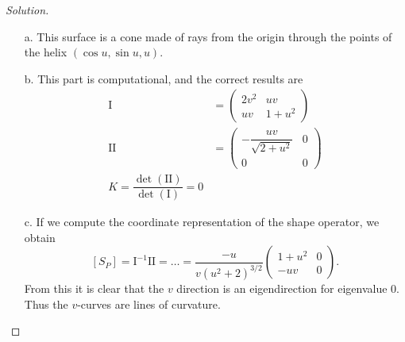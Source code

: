 \documentclass[Shifrin_Solutions_Spring_2015]{subfiles}
\begin{document}
\begin{proof}[Solution]
\begin{itemize}
\item[a.] This surface is a cone made of rays from the origin through the points of the helix $(\cos u, \sin u, u)$.

\item[b.] This part is computational, and the correct results are
\begin{align*}
\mathrm{I} & = \begin{pmatrix} 2v^2 & uv \\ uv & 1+u^2 \end{pmatrix} \\
\mathrm{II} & = \begin{pmatrix} -\dfrac{uv}{\sqrt{2+u^2}} & 0 \\ 0 & 0 \end{pmatrix} \\
K = \dfrac{\det(\mathrm{II})}{\det(\mathrm{I})} = 0
\end{align*}

\item[c.] If we compute the coordinate representation of the shape operator, we obtain
\[
\left[ S_P\right] = \mathrm{I}^{-1} \mathrm{II} = \dots = \dfrac{-u}{v(u^2+2)^{3/2}} \begin{pmatrix} 1+u^2 & 0 \\ -uv & 0 \end{pmatrix} .
\]
From this it is clear that the $v$ direction is an eigendirection for eigenvalue $0$. Thus the $v$-curves are lines of curvature.



\end{itemize}
\end{proof}
\end{document}
